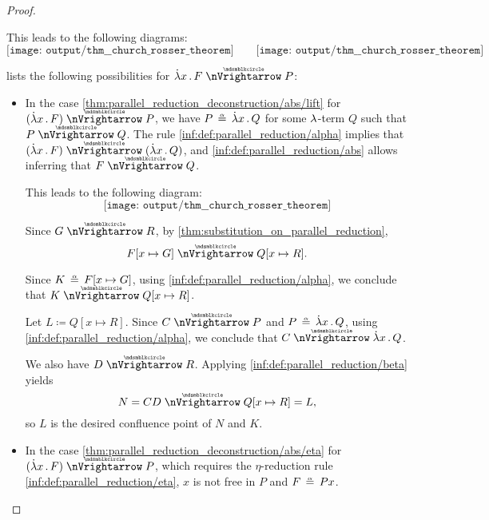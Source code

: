 \begin{proof}
\begin{itemize}
\begin{itemize}
      This leads to the following diagrams:
      \begin{equation*}
        \texttt{[image: output/thm\_\_church\_rosser\_theorem]}
        \quad\quad
        \texttt{[image: output/thm\_\_church\_rosser\_theorem]}
      \end{equation*}

       lists the following possibilities for \( \qabs x F \ppred P \):
      \begin{itemize}
        \item In the case \cref{thm:parallel_reduction_deconstruction/abs/lift} for \( (\qabs x F) \ppred P \), we have \( P \aequiv \qabs x Q \) for some \( {\mathrm \lambda} \)-term \( Q \) such that \( P \ppred Q \). The rule \ref{inf:def:parallel_reduction/alpha} implies that \( (\qabs x F) \ppred (\qabs x Q) \), and \ref{inf:def:parallel_reduction/abs} allows inferring that \( F \ppred Q \).

        This leads to the following diagram:
        \begin{equation*}
          \texttt{[image: output/thm\_\_church\_rosser\_theorem]}
        \end{equation*}

        Since \( G \ppred R \), by \cref{thm:substitution_on_parallel_reduction},
        \begin{equation*}
          F[x \mapsto G] \ppred Q[x \mapsto R].
        \end{equation*}

        Since \( K \aequiv F[x \mapsto G] \), using \ref{inf:def:parallel_reduction/alpha}, we conclude that \( K \ppred Q[x \mapsto R] \).

        Let \( L \coloneqq Q[x \mapsto R] \). Since \( C \ppred P \) and \( P \aequiv \qabs x Q \), using \ref{inf:def:parallel_reduction/alpha}, we conclude that \( C \ppred \qabs x Q \).

        We also have \( D \ppred R \). Applying \ref{inf:def:parallel_reduction/beta} yields
        \begin{equation*}
          N = CD \ppred Q[x \mapsto R] = L,
        \end{equation*}
        so \( L \) is the desired confluence point of \( N \) and \( K \).

        \item In the case \cref{thm:parallel_reduction_deconstruction/abs/eta} for \( (\qabs x F) \ppred P \), which requires the \( \eta \)-reduction rule \ref{inf:def:parallel_reduction/eta}, \( x \) is not free in \( P \) and \( F \aequiv Px \).


\end{itemize}
\end{itemize}
\end{itemize}
\end{proof}

